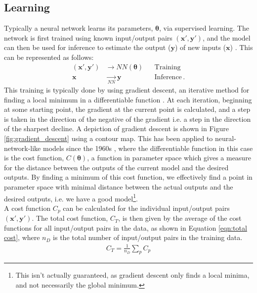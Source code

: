 \documentclass[11pt,a4paper,onecolumn]{report}
\begin{document}
\subsection{Learning}
\label{sec:learning}
Typically a neural network learns its parameters, \(\bm{\theta}\), via
supervised learning. The network is first trained using known input/output pairs
\((\bm{x'}, \bm{y'})\), and the model can then be used for inference to estimate
the output (\(\bm{y}\)) of new inputs (\(\bm{x}\)) \citep{reagen2017}. This can
be represented as follows:
\begin{align*}
  (\bm{x'}, \bm{y'}) &\rightarrow NN(\bm{\theta}) && \text{Training} \\
  \bm{x} &\mathrel{\underset{NN}{\rightarrow}} \bm{y} && \text{Inference} \,.
\end{align*}
This training is typically done by using gradient descent, an iterative method
for finding a local minimum in a differentiable function \citep{cauchy_1847}. At
each iteration, beginning at some starting point, the gradient at the current
point is calculated, and a step is taken in the direction of the negative of the
gradient i.e. a step in the direction of the sharpest decline. A depiction of
gradient descent is shown in Figure \ref{fig:gradient_descent} using a contour
map. This has been applied to neural-network-like models since the 1960s
\citep{bryson1962steepest}, where the differentiable function in this case is
the cost function, \(C(\bm{\theta})\), a function in parameter space which gives
a measure for the distance between the outputs of the current model and the
desired outputs. By finding a minimum of this cost function, we effectively find
a point in parameter space with minimal distance between the actual outputs and
the desired outputs, i.e. we have a good model\footnote{This isn't actually
guaranteed, as gradient descent only finds a local minima, and not necessarily
the global minimum.}.\\

A cost function \(C_p\) can be calculated for the individual input/output pairs
\((\bm{x'}, \bm{y'})\). The total cost function, \(C_T\), is then given by the
average of the cost functions for all input/output pairs in the data, as shown
in Equation \ref{eqn:total cost}, where \(n_D\) is the total number of
input/output pairs in the training data.
\begin{align}
  C_T = \frac{1}{n_D} \sum\limits_{p} C_p \label{eqn:total cost}
\end{align}
\end{document}

